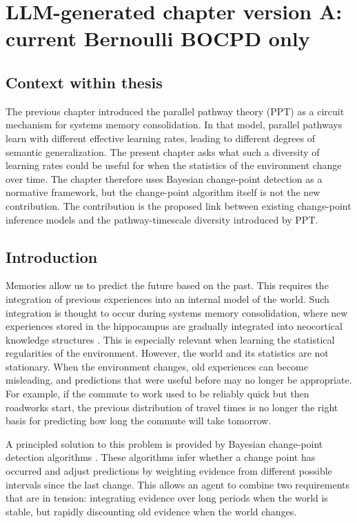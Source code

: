 
\section{LLM-generated chapter version A: current Bernoulli BOCPD only}
\label{sec:cpd-llm-version-a}

\subsection{Context within thesis}
\label{sec:cpd-a-context}

The previous chapter introduced the parallel pathway theory (PPT) as a circuit mechanism for systems memory consolidation. In that model, parallel pathways learn with different effective learning rates, leading to different degrees of semantic generalization. The present chapter asks what such a diversity of learning rates could be useful for when the statistics of the environment change over time. The chapter therefore uses Bayesian change-point detection as a normative framework, but the change-point algorithm itself is not the new contribution. The contribution is the proposed link between existing change-point inference models and the pathway-timescale diversity introduced by PPT.

\subsection{Introduction}
\label{sec:cpd-a-introduction}

Memories allow us to predict the future based on the past. This requires the integration of previous experiences into an internal model of the world. Such integration is thought to occur during systems memory consolidation, where new experiences stored in the hippocampus are gradually integrated into neocortical knowledge structures \citep{McClelland1995}. This is especially relevant when learning the statistical regularities of the environment. However, the world and its statistics are not stationary. When the environment changes, old experiences can become misleading, and predictions that were useful before may no longer be appropriate. For example, if the commute to work used to be reliably quick but then roadworks start, the previous distribution of travel times is no longer the right basis for predicting how long the commute will take tomorrow.

A principled solution to this problem is provided by Bayesian change-point detection algorithms \citep{Adams2007}. These algorithms infer whether a change point has occurred and adjust predictions by weighting evidence from different possible intervals since the last change. This allows an agent to combine two requirements that are in tension: integrating evidence over long periods when the world is stable, but rapidly discounting old evidence when the world changes.

